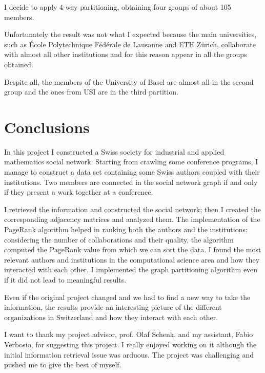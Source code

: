 \documentclass[]{usiinfbachelorproject}
\begin{document}
I decide to apply 4-way partitioning, obtaining four groups of about 105 members.

Unfortunately the result was not what I expected because the main universities, such as \'{E}cole Polytechnique F\'{e}d\'{e}rale de Lausanne and ETH Z\"{u}rich, collaborate with almost all other institutions and for this reason appear in all the groups obtained.  

Despite all, the members of the University of Basel are almost all in the second group and the ones from USI are in the third partition.







\section{Conclusions} \label{sec:conclusions}
In this project I constructed a Swiss society for industrial and applied mathematics social network. 
Starting from crawling some conference programs, I manage to construct a data set containing some Swiss authors coupled with their institutions. Two members are connected in the social network graph if and only if they present a work together at a conference. 

I retrieved the information and constructed the social network; then I created the corresponding adjacency matrices and analyzed them. The implementation of the PageRank algorithm helped in ranking both the authors and the institutions: considering the number of collaborations and their quality, the algorithm computed the PageRank value from which we can sort the data. 
I found the most relevant authors and institutions in the computational science area and how they interacted with each other.
I implemented the graph partitioning algorithm even if it did not lead to meaningful results.

Even if the original project changed and we had to find a new way to take the information, the results provide an interesting picture of the different organizations in Switzerland and how they interact with each other.

I want to thank my project advisor, prof. Olaf Schenk, and my assistant, Fabio Verbosio, for suggesting this project. I really enjoyed working on it although the initial information retrieval issue was arduous.
The project was challenging and pushed me to give the best of myself.

\newpage


\end{document}
